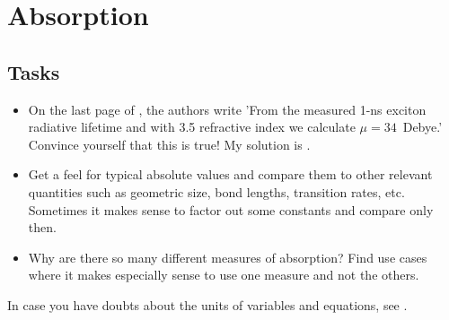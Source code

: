 \renewcommand{\lastmod}{March 15, 2024}
\renewcommand{\chapterauthors}{Markus Lippitz}

\chapter{Absorption}




\section{Tasks}

\begin{itemize}
\item On the last page of \cite{Borri:2002p139}, the authors write 'From the measured 1-ns exciton radiative lifetime and with 3.5 refractive index we calculate $\mu = 34$~Debye.' Convince yourself that this is true! My solution is .





\item Get a feel for typical absolute values and compare them to other relevant quantities such as geometric size, bond lengths, transition rates, etc. Sometimes it makes sense to factor out some constants and compare only then.

\item Why are there so many different measures of absorption? Find use cases where it makes especially sense to use one measure and not the others.

\end{itemize}


In case you have doubts about the units of variables and equations, see .





